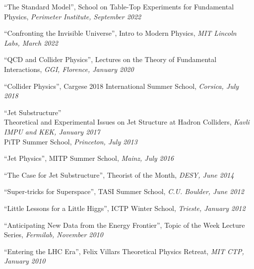 \bbl

\item ``The Standard Model'', School on Table-Top Experiments for Fundamental Physics, \emph{Perimeter Institute, September 2022}

\item ``Confronting the Invisible Universe'', Intro to Modern Physics, \emph{MIT Lincoln Labs, March 2022}

\item ``QCD and Collider Physics'', Lectures on the Theory of Fundamental Interactions, \emph{GGI, Florence, January 2020}

\item ``Collider Physics'', Cargese 2018 International Summer School, \emph{Corsica, July 2018}

\item ``Jet Substructure''
\\ Theoretical and Experimental Issues on Jet Structure at Hadron Colliders, \emph{Kavli IMPU and KEK, January 2017}
\\ PiTP Summer School, \emph{Princeton, July 2013}

\item ``Jet Physics'', MITP Summer School, \emph{Mainz, July 2016}

\item ``The Case for Jet Substructure'', Theorist of the Month, \emph{DESY, June 2014}

\item ``Super-tricks for Superspace'', TASI Summer School, \emph{C.U. Boulder, June 2012}

\item ``Little Lessons for a Little Higgs'', ICTP Winter School, \emph{Trieste, January 2012}

\item ``Anticipating New Data from the Energy Frontier'', Topic of the Week Lecture Series, \emph{Fermilab, November 2010}

\item ``Entering the LHC Era'', Felix Villars Theoretical Physics Retreat, \emph{MIT CTP, January 2010}

\el
